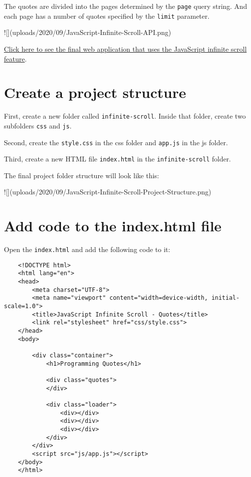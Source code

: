 \documentclass[11pt]{article}
\begin{document}
\noindent
The quotes are divided into the pages determined by the \verb|page| query string.
And each page has a number of quotes specified by the \verb|limit| parameter.

![](uploads/2020/09/JavaScript-Infinite-Scroll-API.png)

\noindent
\href{https://www.javascripttutorial.net/sample/dom/infinite-scroll/}{Click here to see the final web application that uses the JavaScript infinite scroll feature}.

\section*{Create a project structure}

First, create a new folder called \verb|infinite-scroll|. Inside that folder,
create two subfolders \verb|css| and \verb|js|.
\newline

\noindent
Second, create the \verb|style.css| in the css folder and \verb|app.js| in the js folder.
\newline

\noindent
Third, create a new HTML file \verb|index.html| in the \verb|infinite-scroll| folder.
\newline

\noindent
The final project folder structure will look like this:

![](uploads/2020/09/JavaScript-Infinite-Scroll-Project-Structure.png)

\section*{Add code to the index.html file}

Open the \verb|index.html| and add the following code to it:

\begin{lstlisting}
    <!DOCTYPE html>
    <html lang="en">
    <head>
        <meta charset="UTF-8">
        <meta name="viewport" content="width=device-width, initial-scale=1.0">
        <title>JavaScript Infinite Scroll - Quotes</title>
        <link rel="stylesheet" href="css/style.css">
    </head>
    <body>

        <div class="container">
            <h1>Programming Quotes</h1>

            <div class="quotes">
            </div>

            <div class="loader">
                <div></div>
                <div></div>
                <div></div>
            </div>
        </div>
        <script src="js/app.js"></script>
    </body>
    </html>
\end{lstlisting}
\end{document}
